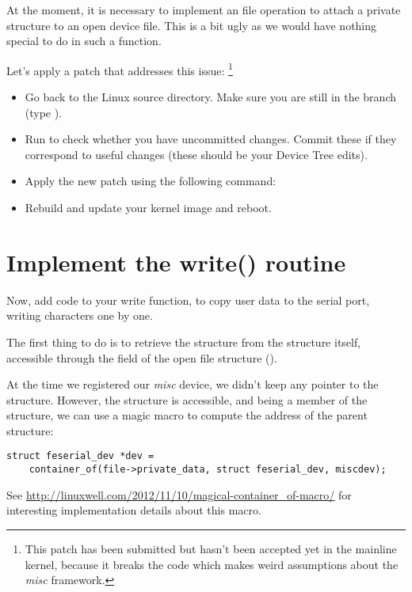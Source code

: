 At the moment, it is necessary to implement an  file
operation to attach a private structure to an open device file. This is
a bit ugly as we would have nothing special to do in such a function.

Let's apply a patch that addresses this issue:
\footnote{This patch has been submitted but hasn't been accepted yet in
the mainline kernel, because it breaks the  code which makes
weird assumptions about the {\em misc} framework.}

\begin{itemize}
\item Go back to the Linux source directory. Make sure you are still in
      the  branch (type ).
\item Run  to check whether you have uncommitted
      changes. Commit these if they correspond to useful changes (these
      should be your Device Tree edits).
\item Apply the new patch using the following command:
\item Rebuild and update your kernel image and reboot.
\end{itemize}

\section{Implement the write() routine}

Now, add code to your write function, to copy user data to the serial
port, writing characters one by one.

The first thing to do is to retrieve the  structure
from the  structure itself, accessible through the
 field of the open file structure ().

At the time we registered our {\em misc} device, we didn't keep any
pointer to the  structure. However, the
 structure is accessible, and being a member of the
 structure, we can use a magic macro to compute
the address of the parent structure:

\begin{verbatim}
struct feserial_dev *dev =
	container_of(file->private_data, struct feserial_dev, miscdev);
\end{verbatim}

See \url{http://linuxwell.com/2012/11/10/magical-container_of-macro/}
for interesting implementation details about this macro.

